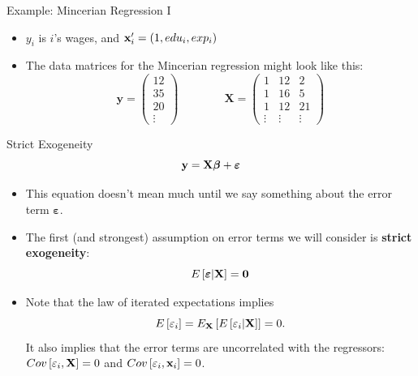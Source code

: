 \begin{frame}{Example: Mincerian Regression I}
\begin{itemize}
	\item $y_{i}$ is $i$'s wages, and ${\bf x}_i' = \left(1,edu_i,exp_i \right)$

	\medskip
	\item The data matrices for the Mincerian regression might look like this:
\[
\boldsymbol{y}=\left(\begin{array}{c}
12\\
35\\
20\\
\vdots
\end{array}\right)\qquad\qquad\boldsymbol{X}=\left(\begin{array}{ccc}
1 & 12 & 2\\
1 & 16 & 5\\
1 & 12 & 21\\
\vdots & \vdots & \vdots
\end{array}\right)
\]
\end{itemize}
\end{frame}

\begin{frame}{Strict Exogeneity}
	\begin{equation*}
		{\bf y}= {\bf X} \boldsymbol{\beta} + \boldsymbol{\varepsilon}
	\end{equation*}
\begin{itemize}
	\item This equation doesn't mean much until we say something about the error term $\boldsymbol{\varepsilon}$.

	\item The first (and strongest) assumption on error terms we will consider is {\bf strict exogeneity}:\[
		E\left[\boldsymbol{\varepsilon} | {\bf X} \right] = {\bf 0}
	\]

	\item Note that the law of iterated expectations implies\[
		E\left[\varepsilon_i\right] = E_{{\bf X}} \left[E\left[\varepsilon_i | {\bf X}\right] \right] = 0.
	\]
	It also implies that the error terms are uncorrelated with the regressors: $Cov\left[\varepsilon_{i},{\bf X}\right]=0$ 
	and $Cov\left[\varepsilon_{i}, {\bf x}_{i}\right]=0$.
\end{itemize}
\end{frame}


